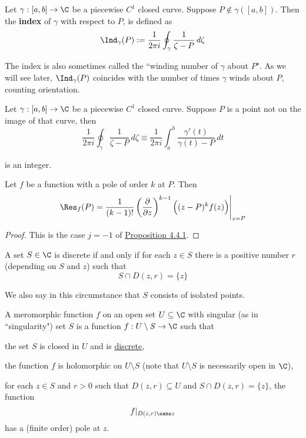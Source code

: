 \label{bfdcc82}

Let $\gamma:[a,b]\to\C$ be a piecewise $C^1$ closed curve. Suppose
$P\notin\gamma([a,b])$. Then the \textbf{index} of $\gamma$ with respect to
$P$, is defined as
$$
  \Ind_\gamma(P):=\frac1{2\pi i}\oint_\gamma\frac1{\zeta-P}\,d\zeta
$$

The index is also sometimes called the ``winding number of $\gamma$ about $P$".
As we will see later, $\Ind_\gamma(P)$ coincides with the number of times
$\gamma$ winds about $P$, counting orientation.

\label{ff34baf}

Let $\gamma:[a,b]\to\C$ be a piecewise $C^1$ closed curve. Suppose $P$ is a
point not on the image of that curve, then
$$
  \frac1{2\pi i}\oint_\gamma\frac1{\zeta-P}\,d\zeta
  \equiv
  \frac1{2\pi i}\int_a^b\frac{\gamma'(t)}{\gamma(t)-P}\,dt
$$

is an integer.

\label{a264ecd}

Let $f$ be a function with a pole of order $k$ at $P$. Then
$$
  \Res_f(P)=\frac1{(k-1)!}\left(\frac\partial{\partial z}\right)^{k-1}
  \Big((z-P)^kf(z)\Big)\Bigg|_{z=P}
$$

\begin{proof}
  This is the case $j=-1$ of \href{c1d2d0c}{Proposition 4.4.1}.
\end{proof}

\label{d1b9ae6}

A set $S\in\C$ is discrete if and only if for each $z\in S$ there is a positive
number $r$ (depending on $S$ and $z$) such that
$$
  S\cap D(z,r)=\{z\}
$$

We also say in this circumstance that $S$ consists of isolated points.

\label{cfba843}

A meromorphic function $f$ on an open set $U\subseteq\C$ with singular (as in
``singularity") set $S$ is a function $f:U\setminus S\to\C$ such that
\begin{enumerata}
  \item the set $S$ is closed in $U$ and is \href{d1b9ae6}{discrete},
  \item the function $f$ is holomorphic on $U\setminus S$ (note that $U\setminus S$ is
  necessarily open in $\C$),
  \item for each $z\in S$ and $r>0$ such that $D(z,r)\subseteq U$ and $S\cap
  D(z,r)=\{z\}$, the function
  $$
    f|_{D(z,r)\sans z}
  $$
  has a (finite order) pole at $z$.
\end{enumerata}

